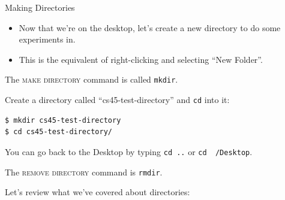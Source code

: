 \begin{frame}[fragile]{Making Directories}
  \begin{itemize}
    \item
      Now that we're on the desktop, let's create a new directory to do some
      experiments in.
    \item
      This is the equivalent of right-clicking and selecting \enquote{New Folder}.
  \end{itemize}
  \pause
  \alert<2>{The \textsc{make directory} command is called \texttt{mkdir}.}

  \pause
  \begin{example}[mkdir]
    Create a directory called \enquote{cs45-test-directory} and \texttt{cd} into it:
    \begin{verbatim}
$ mkdir cs45-test-directory
$ cd cs45-test-directory/
    \end{verbatim}
  \end{example}
  You can go back to the Desktop by typing \texttt{cd ..} or
  \texttt{cd ~/Desktop}.

  \pause
  \alert{The \textsc{remove directory} command is \texttt{rmdir}.}

\end{frame}

Let's review what we've covered about directories:


